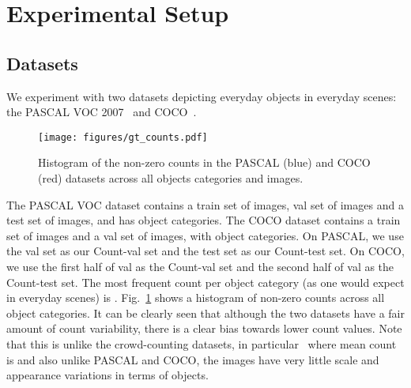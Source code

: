 \documentclass[10pt,twocolumn,letterpaper]{article}
\newcommand{\pascal}{PASCAL\xspace}
\begin{document}
\begin{comment}

\subsection{Associative Subitizing Layer} Finally, we implement associative subitizing as a layer in a neural network. We take a pretrained CNN trained for the Image Net classification task. We remove its fully connected layers and add another convolutional layer which behaves as a counting layer This fully convolutional layer produces an output feature map of C channels, where C is the number of categories. We treat these channels as the counts for each of the categories. We then sum the counts at each channel to get a C sized vector of count values. We can compute the loss of this prediction with respect to the ground truth, and backpropagate the error. we can nautrally choose the discretization in the input image by chooing which conv-layer to augment with counting and by picking different strides for convolution. Finally, we can account for contextual information (eg. table count influences chair count \etc.) by performing  convolution on the output channels to get the final count. 
\end{comment}
 
\section{Experimental Setup}\label{sec:exp_setup}
\subsection{Datasets} 
We experiment with two datasets depicting everyday objects in everyday scenes: the \pascal VOC 2007~\cite{Everingham15} and COCO~\cite{LinECCV14coco}. 
\begin{figure}[t]
\texttt{[image: figures/gt\_counts.pdf]}
\vspace{-15pt}
\caption{\footnotesize{Histogram of the non-zero counts in the PASCAL (blue) and COCO (red) datasets across all objects categories and images.}}
\label{fig:histograms}
\vspace{-15pt}
\end{figure}
The PASCAL VOC dataset contains a train set of  images, val set of  images and a test set of  images, and has  object categories. The COCO dataset contains a train set of  images and a val set of  images, with  object categories. On PASCAL, we use the val set as our Count-val set and the test set as our Count-test set. On COCO, we use the first half of val as the Count-val set and the second half of val as the Count-test set. The most frequent count per object category (as one would expect in everyday scenes) is . Fig.~\ref{fig:histograms} shows a histogram of non-zero counts across all object categories. It can be clearly seen that although the two datasets have a fair amount of count variability, there is a clear bias towards lower count values. Note that this is unlike the crowd-counting datasets, in particular~\cite{Idrees} where mean count is    and also unlike PASCAL and COCO, the images have very little scale and appearance variations in terms of objects. 
\end{document}
